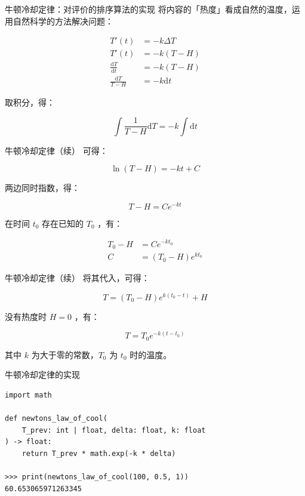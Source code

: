 \documentclass[UTF8]{ctexbeamer}
\begin{document}
\begin{frame}{牛顿冷却定律：对评价的排序算法的实现}
将内容的「热度」看成自然的温度，运用自然科学的方法解决问题：

\begin{align}
  T' (t) &= -k \Delta T \\
  T' (t) &= -k (T - H) \\
  \frac{\mathrm{d}T}{\mathrm{d}t} &= -k (T - H) \\
  \frac{\mathrm{d}T}{T - H} &= -k \mathrm{d}t
\end{align}

取积分，得：

$$\int \frac{1}{T - H} \mathrm{d}T = -k \int \mathrm{d}t$$
\end{frame}

\begin{frame}{牛顿冷却定律（续）}
可得：

$$\ln (T - H) = -kt + C$$

两边同时指数，得：

$$T - H = C e^{-kt}$$

在时间 $t_0$ 存在已知的 $T_0$ ，有：

\begin{align}
T_0 - H &= C e^{-kt_0} \\
C &= (T_0 - H) e^{kt_0}
\end{align}
\end{frame}

\begin{frame}{牛顿冷却定律（续）}
将其代入，可得：

$$
T = (T_0 - H) e^{k(t_0 - t)} + H
$$

没有热度时 $H = 0$ ，有：

$$
T = T_0 e ^{-k(t - t_0)}
$$

\small
其中 $k$ 为大于零的常数，$T_0$ 为 $t_0$ 时的温度。
\normalsize
\end{frame}

\begin{frame}[fragile]{牛顿冷却定律的实现}
\begin{verbatim}
import math

def newtons_law_of_cool(
    T_prev: int | float, delta: float, k: float
) -> float:
    return T_prev * math.exp(-k * delta)

>>> print(newtons_law_of_cool(100, 0.5, 1))
60.653065971263345
\end{verbatim}
\end{frame}
\end{document}
